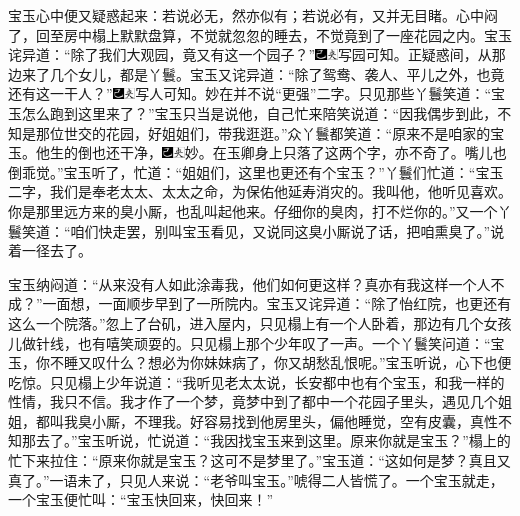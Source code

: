 宝玉心中便又疑惑起来：若说必无，然亦似有；若说必有，又并无目睹。心中闷了，回至房中榻上默默盘算，不觉就忽忽的睡去，不觉竟到了一座花园之内。宝玉诧异道：“除了我们大观园，竟又有这一个园子？”{\includegraphics[width=3mm]{../Images/00003}\includegraphics[width=3mm]{../Images/00012}\footnotesize \kaishu 写园可知。}正疑惑间，从那边来了几个女儿，都是丫鬟。宝玉又诧异道：“除了鸳鸯、袭人、平儿之外，也竟还有这一干人？”{\includegraphics[width=3mm]{../Images/00003}\includegraphics[width=3mm]{../Images/00012}\footnotesize \kaishu 写人可知。妙在并不说“更强”二字。}只见那些丫鬟笑道：“宝玉怎么跑到这里来了？”宝玉只当是说他，自己忙来陪笑说道：“因我偶步到此，不知是那位世交的花园，好姐姐们，带我逛逛。”众丫鬟都笑道：“原来不是咱家的宝玉。他生的倒也还干净，{\includegraphics[width=3mm]{../Images/00003}\includegraphics[width=3mm]{../Images/00012}\footnotesize \kaishu 妙。在玉卿身上只落了这两个字，亦不奇了。}嘴儿也倒乖觉。”宝玉听了，忙道：“姐姐们，这里也更还有个宝玉？”丫鬟们忙道：“宝玉二字，我们是奉老太太、太太之命，为保佑他延寿消灾的。我叫他，他听见喜欢。你是那里远方来的臭小厮，也乱叫起他来。仔细你的臭肉，打不烂你的。”又一个丫鬟笑道：“咱们快走罢，别叫宝玉看见，又说同这臭小厮说了话，把咱熏臭了。”说着一径去了。

宝玉纳闷道：“从来没有人如此涂毒我，他们如何更这样？真亦有我这样一个人不成？”一面想，一面顺步早到了一所院内。宝玉又诧异道：“除了怡红院，也更还有这么一个院落。”忽上了台矶，进入屋内，只见榻上有一个人卧着，那边有几个女孩儿做针线，也有嘻笑顽耍的。只见榻上那个少年叹了一声。一个丫鬟笑问道：“宝玉，你不睡又叹什么？想必为你妹妹病了，你又胡愁乱恨呢。”宝玉听说，心下也便吃惊。只见榻上少年说道：“我听见老太太说，长安都中也有个宝玉，和我一样的性情，我只不信。我才作了一个梦，竟梦中到了都中一个花园子里头，遇见几个姐姐，都叫我臭小厮，不理我。好容易找到他房里头，偏他睡觉，空有皮囊，真性不知那去了。”宝玉听说，忙说道：“我因找宝玉来到这里。原来你就是宝玉？”榻上的忙下来拉住：“原来你就是宝玉？这可不是梦里了。”宝玉道：“这如何是梦？真且又真了。”一语未了，只见人来说：“老爷叫宝玉。”唬得二人皆慌了。一个宝玉就走，一个宝玉便忙叫：“宝玉快回来，快回来！”

